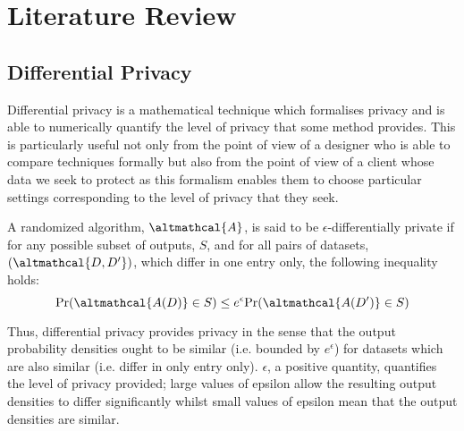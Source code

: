 
\chapter{Literature Review}
%
\graphicspath{{LitReview/Figs/}}

\section{Differential Privacy}
Differential privacy is a mathematical technique which formalises privacy and is able to numerically quantify the level of privacy that some method provides. This is particularly useful not only from the point of view of a designer who is able to compare techniques formally but also from the point of view of a client whose data we seek to protect as this formalism enables them to choose particular settings corresponding to the level of privacy that they seek. 


\begin{definition}
	A randomized algorithm, $\altmathcal{A}$, is said to be $\epsilon$-differentially private if for any possible subset of outputs, $S$, and for all pairs of datasets, $(\altmathcal{D, D'})$, which differ in one entry only, the following inequality holds:
	\begin{equation}
	\text{Pr}(\altmathcal{A(D)} \in S) \leq e^\epsilon \text{Pr}(\altmathcal{A(D')} \in S) 
	\end{equation}
\end{definition}

Thus, differential privacy provides privacy in the sense that the output probability densities ought to be similar (i.e. bounded by $e^{\epsilon}$) for datasets which are also similar (i.e. differ in only entry only). $\epsilon$, a positive quantity, quantifies the level of privacy provided; large values of epsilon allow the resulting output densities to differ significantly whilst small values of epsilon mean that the output densities are similar. \cite{foundations}   

